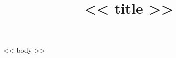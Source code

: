 \documentclass[11pt,letter,sans]{moderncv}
\title{<< title >>}
\begin{document}
\makecvtitle

<< body >>
\end{document}
